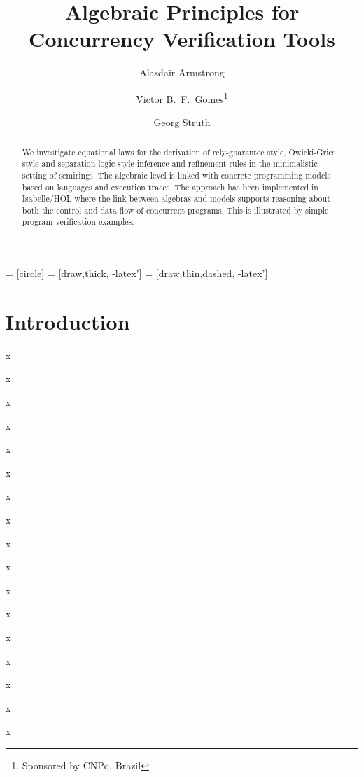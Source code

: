 \documentclass{llncs}
\begin{document}
 = [circle]
 = [draw,thick, -latex']
 = [draw,thin,dashed, -latex']

\title{Algebraic Principles for Concurrency Verification Tools}

\author{Alasdair Armstrong \and Victor B.~F.~Gomes\thanks{Sponsored by CNPq, Brazil}  \and Georg Struth}


\maketitle

\begin{abstract}
We investigate equational laws for the derivation of rely-guarantee
style, Owicki-Gries style and separation logic style inference and
refinement rules in the minimalistic setting of semirings. The
algebraic level is linked with concrete programming models based on
languages and execution traces. The approach has been implemented in
Isabelle/HOL where the link between algebras and models supports
reasoning about both the control and data flow of concurrent
programs. This is illustrated by simple program verification examples.
\end{abstract}

\pagestyle{plain}

\section{Introduction}

x

x

x

x

x

x

x

x

x

x

x

x

x

x

x

x

x
\end{document}
